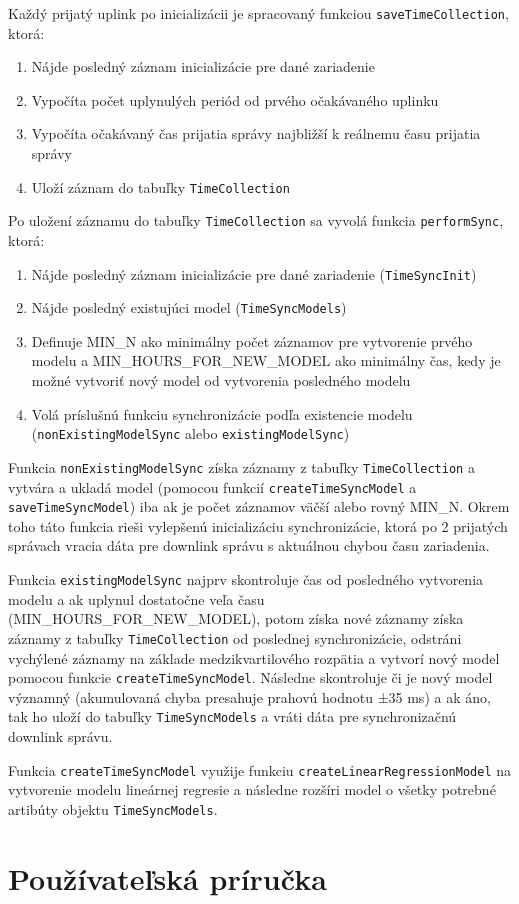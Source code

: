 Každý prijatý uplink po inicializácii je spracovaný funkciou \texttt{saveTimeCollection}, ktorá:
\begin{enumerate}
    \item Nájde posledný záznam inicializácie pre dané zariadenie
    \item Vypočíta počet uplynulých periód od prvého očakávaného uplinku
    \item Vypočíta očakávaný čas prijatia správy najbližší k reálnemu času prijatia správy
    \item Uloží záznam do tabuľky \texttt{TimeCollection}
\end{enumerate}
Po uložení záznamu do tabuľky \texttt{TimeCollection} sa vyvolá funkcia \texttt{performSync}, ktorá:
\begin{enumerate}
    \item Nájde posledný záznam inicializácie pre dané zariadenie (\texttt{TimeSyncInit})
    \item Nájde posledný existujúci model (\texttt{TimeSyncModels})
    \item Definuje MIN\_N ako minimálny počet záznamov pre vytvorenie prvého modelu a MIN\_HOURS\_FOR\_NEW\_MODEL ako minimálny čas, kedy je možné vytvoriť nový model od vytvorenia posledného modelu
    \item Volá príslušnú funkciu synchronizácie podľa existencie modelu (\texttt{nonExistingModelSync} alebo \texttt{existingModelSync})
\end{enumerate}

Funkcia \texttt{nonExistingModelSync} získa záznamy z tabuľky \texttt{TimeCollection} a vytvára a ukladá model (pomocou funkcií \texttt{createTimeSyncModel} a \texttt{saveTimeSyncModel}) iba ak je počet záznamov väčší alebo rovný MIN\_N. Okrem toho táto funkcia rieši vylepšenú inicializáciu synchronizácie, ktorá po 2 prijatých správach vracia dáta pre downlink správu s aktuálnou chybou času zariadenia.

Funkcia \texttt{existingModelSync} najprv skontroluje čas od posledného vytvorenia modelu a ak uplynul dostatočne veľa času (MIN\_HOURS\_FOR\_NEW\_MODEL), potom získa nové záznamy získa záznamy z tabuľky \texttt{TimeCollection} od poslednej synchronizácie, odstráni vychýlené záznamy na základe medzikvartilového rozpätia a vytvorí nový model pomocou funkcie \texttt{createTimeSyncModel}. Následne skontroluje či je nový model významný (akumulovaná chyba presahuje prahovú hodnotu ±35 ms) a ak áno, tak ho uloží do tabuľky \texttt{TimeSyncModels} a vráti dáta pre synchronizačnú downlink správu.

Funkcia \texttt{createTimeSyncModel} využije funkciu \texttt{createLinearRegressionModel} na vytvorenie modelu lineárnej regresie a následne rozšíri model o všetky potrebné artibúty objektu \texttt{TimeSyncModels}.




\section{Používateľská príručka}






